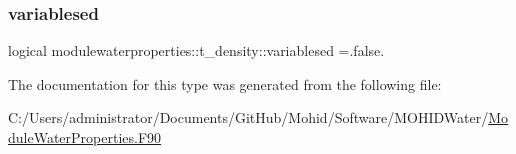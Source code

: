 \subsubsection{\texorpdfstring{variablesed}{variablesed}}
{\footnotesize\ttfamily logical modulewaterproperties\+::t\+\_\+density\+::variablesed =.false.\hspace{0.3cm}{\ttfamily [private]}}



The documentation for this type was generated from the following file\+:\begin{DoxyCompactItemize}
\item 
C\+:/\+Users/administrator/\+Documents/\+Git\+Hub/\+Mohid/\+Software/\+M\+O\+H\+I\+D\+Water/\mbox{\hyperlink{_module_water_properties_8_f90}{Module\+Water\+Properties.\+F90}}\end{DoxyCompactItemize}
